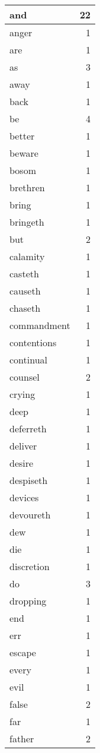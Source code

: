 \begin{center}
\begin{longtable}{l|r}
and & 22\\ \hline 
anger & 1\\ \hline 
are & 1\\ \hline 
as & 3\\ \hline 
away & 1\\ \hline 
back & 1\\ \hline 
be & 4\\ \hline 
better & 1\\ \hline 
beware & 1\\ \hline 
bosom & 1\\ \hline 
brethren & 1\\ \hline 
bring & 1\\ \hline 
bringeth & 1\\ \hline 
but & 2\\ \hline 
calamity & 1\\ \hline 
casteth & 1\\ \hline 
causeth & 1\\ \hline 
chaseth & 1\\ \hline 
commandment & 1\\ \hline 
contentions & 1\\ \hline 
continual & 1\\ \hline 
counsel & 2\\ \hline 
crying & 1\\ \hline 
deep & 1\\ \hline 
deferreth & 1\\ \hline 
deliver & 1\\ \hline 
desire & 1\\ \hline 
despiseth & 1\\ \hline 
devices & 1\\ \hline 
devoureth & 1\\ \hline 
dew & 1\\ \hline 
die & 1\\ \hline 
discretion & 1\\ \hline 
do & 3\\ \hline 
dropping & 1\\ \hline 
end & 1\\ \hline 
err & 1\\ \hline 
escape & 1\\ \hline 
every & 1\\ \hline 
evil & 1\\ \hline 
false & 2\\ \hline 
far & 1\\ \hline 
father & 2\\ \hline 

\end{longtable}
\end{center}
